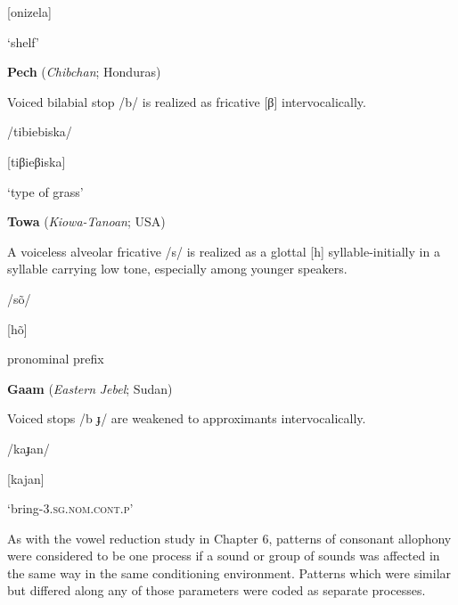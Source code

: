 [onizela]



‘shelf’



\citep[30-1]{Bonvillain1973}


\z

\ea\label{ex:(7.15)}
  \textbf{Pech} (\textit{Chibchan}; Honduras)



Voiced bilabial stop /b/ is realized as fricative [β] intervocalically.



/tibiebiska/



[tiβieβiska]



‘type of grass’



\citep[16]{Holt1999}

\z


\ea\label{ex:(7.16)}
  \textbf{Towa} (\textit{Kiowa-Tanoan}; USA)



A voiceless alveolar fricative /s/ is realized as a glottal [h] syllable-initially in a syllable carrying low tone, especially among younger speakers.



/sõ/



[hõ]



pronominal prefix



\citep[13]{Yumitani1998}
\z



\ea\label{ex:(7.17)}
  \textbf{Gaam} (\textit{Eastern} \textit{Jebel}; Sudan)



Voiced stops /b ɟ/ are weakened to approximants intervocalically.



/kaɟan/



[kajan]



‘bring-3.\textsc{sg.nom.cont.p}’



\citep[24-5]{Stirtz2011}
\z



  As with the vowel reduction study in Chapter 6, patterns of consonant allophony were considered to be one process if a sound or group of sounds was affected in the same way in the same conditioning environment. Patterns which were similar but differed along any of those parameters were coded as separate processes.


